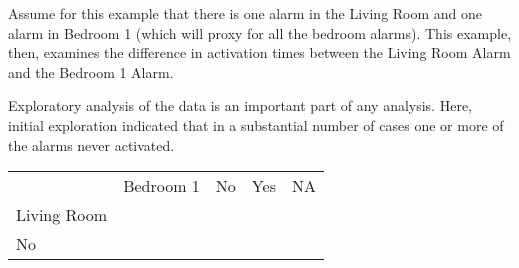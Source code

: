 \documentclass[
]{article}
\begin{document}
Assume for this example that there is one alarm in the Living Room and
one alarm in Bedroom 1 (which will proxy for all the bedroom alarms).
This example, then, examines the difference in activation times between
the Living Room Alarm and the Bedroom 1 Alarm.

Exploratory analysis of the data is an important part of any analysis.
Here, initial exploration indicated that in a substantial number of
cases one or more of the alarms never activated.

\begin{longtable}[]{@{}lcccc@{}}
\toprule
\endhead
\begin{minipage}[t]{0.17\columnwidth}\raggedright
\strut
\end{minipage} & \begin{minipage}[t]{0.14\columnwidth}\centering
Bedroom 1\strut
\end{minipage} & \begin{minipage}[t]{0.08\columnwidth}\centering
No\strut
\end{minipage} & \begin{minipage}[t]{0.08\columnwidth}\centering
Yes\strut
\end{minipage} & \begin{minipage}[t]{0.08\columnwidth}\centering
NA\strut
\end{minipage}\tabularnewline
\begin{minipage}[t]{0.17\columnwidth}\raggedright
Living Room\strut
\end{minipage} & \begin{minipage}[t]{0.14\columnwidth}\centering
\strut
\end{minipage} & \begin{minipage}[t]{0.08\columnwidth}\centering
\strut
\end{minipage} & \begin{minipage}[t]{0.08\columnwidth}\centering
\strut
\end{minipage} & \begin{minipage}[t]{0.08\columnwidth}\centering
\strut
\end{minipage}\tabularnewline
\begin{minipage}[t]{0.17\columnwidth}\raggedright
No\strut
\end{minipage} & \begin{minipage}[t]{0.14\columnwidth}\centering
\strut
\end{minipage} & \begin{minipage}[t]{0.08\columnwidth}\centering
738\strut

\end{minipage}
\end{longtable}
\end{document}
